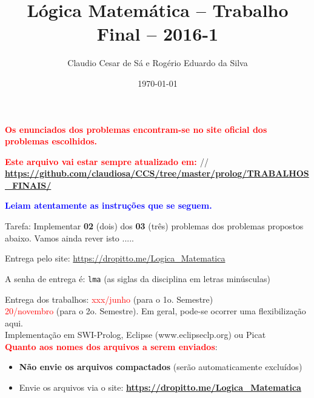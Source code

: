 \documentclass[a4paper,12pt]{article}
\title{Lógica Matemática -- Trabalho Final -- 2016-1}
\author{Claudio Cesar de Sá e Rogério Eduardo da Silva}
\date{\today}
\begin{document}
\maketitle

\begin{flushleft}


\vspace{0.5cm}
  {\bf \textcolor{red}{Os enunciados dos problemas encontram-se no site oficial dos problemas escolhidos.}}


\vspace{0.5cm}
  {\bf \textcolor{red}{Este arquivo vai estar sempre atualizado em: }}//
{\bf \textcolor{red}{\url{https://github.com/claudiosa/CCS/tree/master/prolog/TRABALHOS_FINAIS/}}}



\vspace{0.5cm}
 {\bf \textcolor{blue}{Leiam atentamente as
instruções que se seguem.}}


\vspace{0.5cm}
 Tarefa: Implementar \textbf{02} (dois) dos  \textbf{03} (três)  problemas dos problemas propostos abaixo. Vamos ainda rever isto .....


\vspace{0.5cm}
 Entrega pelo site: \textcolor{red}{\url{https://dropitto.me/Logica_Matematica}}

\vspace{0.5cm}
 A senha de entrega  é: \texttt{lma} (as siglas da disciplina em letras minúsculas)

\vspace{0.5cm}
 Entrega dos trabalhos: \textcolor{red}{xxx/junho} (para o 1o. Semestre)\\
\textcolor{red}{20/novembro} (para o 2o. Semestre). Em geral, pode-se
ocorrer uma flexibilização aqui.\\



\vspace{0.5cm}
 Implementação em SWI-Prolog, Eclipse (www.eclipseclp.org) ou Picat\\

\vspace{0.5cm}
 \textcolor{red}{\textbf{Quanto aos nomes dos arquivos a serem enviados}}:
\begin{itemize}
  \item \textbf{Não envie os arquivos compactados} (serão automaticamente excluídos)
  \item Envie os arquivos  via o site: \textbf{ \url{https://dropitto.me/Logica_Matematica}}


\end{itemize}
\end{flushleft}
\end{document}
